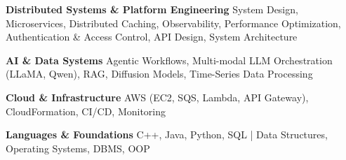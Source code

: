 



\begin{cventries}

\skillOverride
{
    \begin{cvitems} %
        \item{\textbf{Distributed Systems \& Platform Engineering \rightarrow} System Design, Microservices, Distributed Caching, Observability, Performance Optimization, Authentication \& Access Control, API Design, System Architecture}
        \item {\textbf{AI \& Data Systems \rightarrow} Agentic Workflows, Multi-modal LLM Orchestration (LLaMA, Qwen), RAG, Diffusion Models, Time-Series Data Processing}
        \item {\textbf{Cloud \& Infrastructure \rightarrow} AWS (EC2, SQS, Lambda, API Gateway), CloudFormation, CI/CD, Monitoring}
        \item {\textbf{Languages \& Foundations \rightarrow} C++, Java, Python, SQL | Data Structures, Operating Systems, DBMS, OOP}
    \end{cvitems}
}

\end{cventries}
